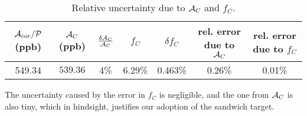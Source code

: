 \begin{table}[!h]
    \centering
    \begin{tabular}{c | c c | c c | c c}
        \hline
	\thead{$\mathcal{A}_{cor}/\mathcal{P}$ \\ (ppb)}   & \thead{$\mathcal{A}_C$ \\ (ppb)}   & $\frac{\delta\mathcal{A}_C}{\mathcal{A}_C}$   & $f_C$ & $\delta f_C$  & \thead{rel. error \\ due to $\mathcal{A}_C$ } & \thead{rel. error \\ due to $f_C$}\\
        \hline
	549.34	& $539.36$  & 4\%   & 6.29\%	& 0.463\%   & 0.26\%	& 0.01\% \\
        \hline
    \end{tabular}
    \caption{Relative uncertainty due to $\mathcal{A}_C$ and $f_C$.}
    \label{tab:prex_C_contam}
\end{table}
The uncertainty caused by the error in $f_C$ is negligible, and the one from $\mathcal{A}_C$
is also tiny, which in hindsight, justifies our adoption of the sandwich target.

\begin{comment}
\bigskip
One could also estimate the rate from measurement. 
\begin{equation}
    \sigma = \sqrt{\frac{1}{R/30}}
\end{equation}
\begin{table}[!h]
    \centering
    \begin{tabular}{c c c | c c c c c c}
	\hline
	Target	& run	& I $(\mu A)$   & \thead{rms \\ ($ppm$)} & \thead{rms@$70\ \mu A$ \\ ($ppm$)} & \thead{bcm res. \\ ($ppm$)}   & \thead{bpm res. \\ ($ppm$)}   & \thead{cor. rms \\ ($ppm$)}  & \thead{rate \\ ($GHz$)}  \\
	\hline
	C12	& 4133	& 86.2	& 143	& 158.7	& 20	& 25	& 150.4	& 1.326	\\
	D-Pb-D	& 4112	& 67.7	& 93	& 91.5	& 20	& 25	& 82.9	& 4.365	\\
	\hline
    \end{tabular}
    \caption{The corrected rms was calculated as: $\sqrt{\frac{\sigma^2 - \sigma^2_{bcm} - \sigma^2_{bpm}}{1 + 0.26^2}}$}
\end{table}
The C graphite target has a thickness of $1.991\ mm$ and a density of 
\end{comment}


